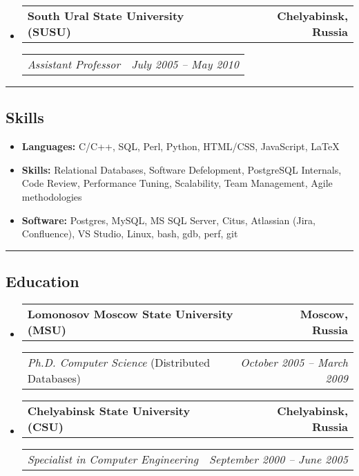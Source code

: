 \documentclass[11pt,letterpaper]{article}
\makeatletter
\newcommand{\headerrow}[2]
{\begin{tabular*}{\linewidth}{l@{\extracolsep{\fill}}r}
#1 &
#2 \\
\end{tabular*}}
\makeatother
\begin{document}
\begin{itemize}[leftmargin=1em]
	\item
	      \headerrow
	      {\textbf{South Ural State University (SUSU)}}
	      {\textbf{Chelyabinsk, Russia}}
	      \headerrow
	      {\emph{Assistant Professor}}
	      {\emph{July 2005 -- May 2010}}
\end{itemize}

\hrule
\vspace{-1em}
\subsection*{\Large Skills}

\begin{itemize}[leftmargin=1em,noitemsep]
	\item \textbf{Languages:}
		C/C++, SQL, Perl, Python, HTML/CSS, JavaScript, \LaTeX
	\item \textbf{Skills:}
		Relational Databases, Software Defelopment, PostgreSQL Internals, Code Review, Performance Tuning, Scalability, Team Management, Agile methodologies
	\item \textbf{Software:}
		Postgres, MySQL, MS SQL Server, Citus, Atlassian (Jira, Confluence), VS Studio, Linux, bash, gdb, perf, git
\end{itemize}

\hrule
\vspace{-1em}
\subsection*{\Large Education}

\begin{itemize}[leftmargin=1em]
	\parskip=0.1em
		
	\item
	      \headerrow
	      {\textbf{Lomonosov Moscow State University (MSU)}}
	      {\textbf{Moscow, Russia}}
	      \headerrow
	      {\emph{Ph.D. Computer Science} (Distributed Databases)}
	      {\emph{October 2005 -- March 2009}}
	\item
	      \headerrow
	      {\textbf{Chelyabinsk State University (CSU)}}
	      {\textbf{Chelyabinsk, Russia}}
	      \headerrow
	      {\emph{Specialist in Computer Engineering}}
	      {\emph{September 2000 -- June 2005}}
	      	      
\end{itemize}
\end{document}
